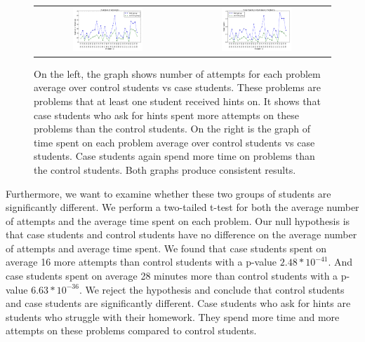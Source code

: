 \documentclass{llncs}
\begin{document}
\begin{figure}[ht]
\centering
\caption{On the left, the graph shows number of attempts for each problem average over control students vs case students. These problems are problems that at least one student received hints on. It shows that case students who ask for hints spent more attempts on these problems than the control students. On the right is the graph of time spent on each problem average over control students vs case students. Case students again spend more time on problems than the control students. Both graphs produce consistent results.}
   \begin{tabular}{c c}
		\includegraphics[width=0.5\textwidth]{image/tries_analysis.png} &
		\includegraphics[width=0.5\textwidth]{image/times_analysis.png}
	\end{tabular}
    \label{fig:tries_times_analysis}
\end{figure}

Furthermore, we want to examine whether these two groups of students are significantly different. We perform a two-tailed t-test for both the average number of attempts and the average time spent on each problem. Our null hypothesis is that case students and control students have no difference on the average number of attempts and average time spent. We found that case students spent on average 16 more attempts than control students with a p-value $2.48*10^{-41}$. And case students spent on average 28 minutes more than control students with a p-value $6.63*10^{-36}$. We reject the hypothesis and conclude that control students and case students are significantly different. Case students who ask for hints are students who struggle with their homework. They spend more time and more attempts on these problems compared to control students.
\end{document}

